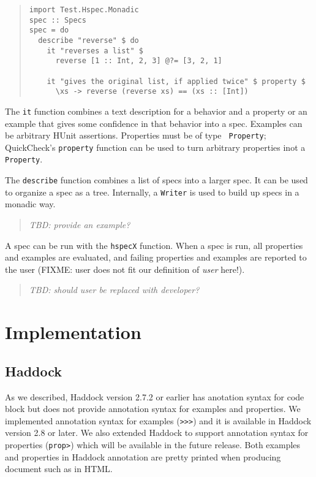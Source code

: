 \documentclass[preprint]{sigplanconf}
\begin{document}
\begin{quote}
\small
\begin{verbatim}
import Test.Hspec.Monadic
spec :: Specs
spec = do
  describe "reverse" $ do
    it "reverses a list" $
      reverse [1 :: Int, 2, 3] @?= [3, 2, 1]

    it "gives the original list, if applied twice" $ property $
      \xs -> reverse (reverse xs) == (xs :: [Int])
\end{verbatim}
\end{quote}

\noindent The {\tt it} function combines a text description for a behavior and
a property or an example that gives some confidence in that behavior into a
spec.
Examples can be arbitrary HUnit assertions.  Properties must be of type {\tt
Property}; QuickCheck's \texttt{property} function can be used to turn
arbitrary properties inot a \texttt{Property}.

The \texttt{describe} function combines a list of specs into a larger spec.  It
can be used to organize a spec as a tree.
Internally, a \texttt{Writer} is used to build up specs in a monadic way.

\begin{quote}
    \emph{TBD: provide an example?}
\end{quote}

A spec can be run with the \texttt{hspecX} function.  When a spec is run, all
properties and examples are evaluated, and failing properties and examples are
reported to the user (FIXME: user does not fit our definition of \emph{user}
here!).

\begin{quote}
    \emph{TBD: should user be replaced with developer?}
\end{quote}


\section{Implementation}

\subsection{Haddock}

As we described, Haddock version 2.7.2 or earlier has
anotation syntax for code block but does not provide
annotation syntax for examples and properties.
We implemented annotation syntax for examples ({\tt >>>}) and 
it is available in Haddock version 2.8 or later.
We also extended Haddock to support annotation syntax for
properties ({\tt prop>})
which will be available in the future release.
Both examples and properties in Haddock annotation are pretty printed when producing document
such as in HTML.
\end{document}
